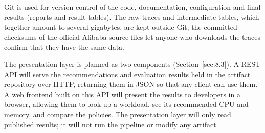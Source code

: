Git is used for version control of the code, documentation, configuration and final results (reports and result tables). The raw traces and intermediate tables, which together amount to several gigabytes, are kept outside Git; the committed checksums of the official Alibaba source files let anyone who downloads the traces confirm that they have the same data.

The presentation layer is planned as two components (Section~\ref{sec:8.3}). A REST API will serve the recommendations and evaluation results held in the artifact repository over HTTP, returning them in JSON so that any client can use them. A web frontend built on this API will present the results to developers in a browser, allowing them to look up a workload, see its recommended CPU and memory, and compare the policies. The presentation layer will only read published results; it will not run the pipeline or modify any artifact.
